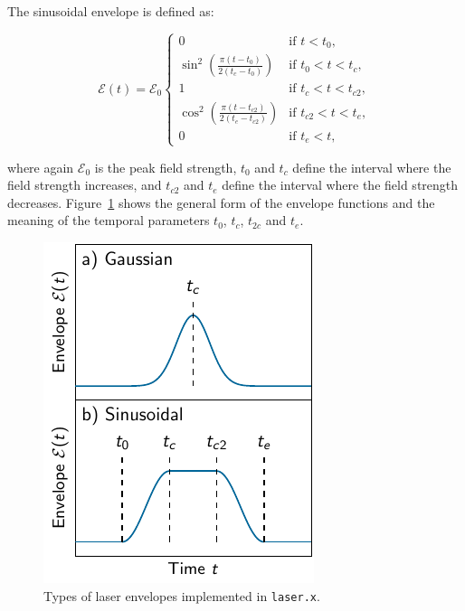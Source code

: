 \documentclass[a4paper,11pt,DIV=15,openany,twoside=false]{scrbook}
\newcommand{\tthdump}[1]{#1}
\newcommand{\ttt}[1]{\texttt{#1}}
\begin{document}
The sinusoidal envelope is defined as:
\tthdump{
  \begin{equation}
    \mathcal{E}(t)=\mathcal{E}_0
    \begin{cases}
      0                                                   &\text{if } t<t_0,\\
      \sin^2\left(\frac{\pi(t-t_0)}{2(t_c-t_0)}\right)      &\text{if } t_0<t<t_c,\\
      1                                                   &\text{if } t_c<t<t_{c2},\\
      \cos^2\left(\frac{\pi(t-t_{c2})}{2(t_e-t_{c2})}\right)      &\text{if } t_{c2}<t<t_e,\\
      0                                                   &\text{if } t_e<t,\label{eq:laser_sinus}
    \end{cases}
  \end{equation}
}
where again $\mathcal{E}_0$ is the peak field strength, $t_0$ and $t_c$ define the interval where the field strength increases, and $t_{c2}$ and $t_e$ define the interval where the field strength decreases. Figure~\ref{fig:laser_envelope} shows the general form of the envelope functions and the meaning of the temporal parameters $t_0$, $t_c$, $t_{2c}$ and $t_e$.

\begin{figure}[h!]
  \centering
  \includegraphics[scale=1]{img/laser_envelope/laser_envelope.pdf}
  \caption{Types of laser envelopes implemented in \ttt{laser.x}.}
  \label{fig:laser_envelope}
\end{figure}
\end{document}
